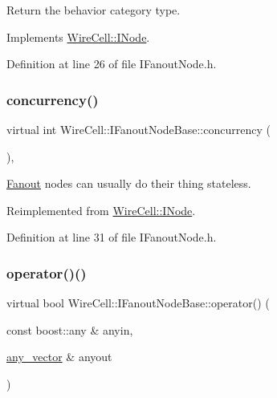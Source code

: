 Return the behavior category type. 



Implements \hyperlink{class_wire_cell_1_1_i_node_a58c07f15b165e5fb33bbc7b2e047b39b}{Wire\+Cell\+::\+I\+Node}.



Definition at line 26 of file I\+Fanout\+Node.\+h.

\mbox{\label{class_wire_cell_1_1_i_fanout_node_base_abda7275bd1a34eab0dfffa8dc29f3b61}} 
\subsubsection{\texorpdfstring{concurrency()}{concurrency()}}
{\footnotesize\ttfamily virtual int Wire\+Cell\+::\+I\+Fanout\+Node\+Base\+::concurrency (\begin{DoxyParamCaption}{ }\end{DoxyParamCaption})\hspace{0.3cm}{\ttfamily [inline]}, {\ttfamily [virtual]}}



\hyperlink{class_wire_cell_1_1_fanout}{Fanout} nodes can usually do their thing stateless. 



Reimplemented from \hyperlink{class_wire_cell_1_1_i_node_a87d2b7293da4f6955e389ac6a2011306}{Wire\+Cell\+::\+I\+Node}.



Definition at line 31 of file I\+Fanout\+Node.\+h.

\mbox{\label{class_wire_cell_1_1_i_fanout_node_base_a2d8314d252381eaeb96c43f312eda8b7}} 
\subsubsection{\texorpdfstring{operator()()}{operator()()}}
{\footnotesize\ttfamily virtual bool Wire\+Cell\+::\+I\+Fanout\+Node\+Base\+::operator() (\begin{DoxyParamCaption}\item[{const boost\+::any \&}]{anyin,  }\item[{\hyperlink{class_wire_cell_1_1_i_fanout_node_base_a855b32ed7f2d37d84aaf21e94edeacc4}{any\+\_\+vector} \&}]{anyout }\end{DoxyParamCaption})\hspace{0.3cm}{\ttfamily [pure virtual]}}



